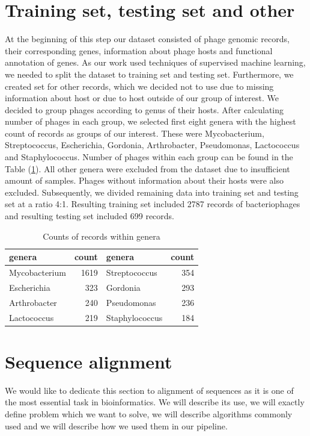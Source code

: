 \section{Training set, testing set and other}
At the beginning of this step our dataset consisted of phage genomic records, their corresponding genes, information about phage hosts and functional annotation of genes.
As our work used techniques of supervised machine learning, we needed to split the dataset to training set and testing set.
Furthermore, we created set for other records, which we decided not to use due to missing information about host or due to host outside of our group of interest.
We decided to group phages according to genus of their hosts.
After calculating number of phages in each group, we selected first eight genera with the highest count of records as groups of our interest.
These were Mycobacterium, Streptococcus, Escherichia, Gordonia, Arthrobacter, Pseudomonas, Lactococcus and Staphylococcus. 
Number of phages within each group can be found in the Table (\ref{tab:counts}).
All other genera were excluded from the dataset due to insufficient amount of samples.
Phages without information about their hosts were also excluded.
Subsequently, we divided remaining data into training set and testing set at a ratio 4:1.
Resulting training set included 2787 records of bacteriophages and resulting testing set included 699 records. 

\begin{table}
  \centering
    \begin{tabular}{ l  r  l  r }
      \hline
      genera & count & genera & count \\
      \hline
      Mycobacterium & 1619 & Streptococcus & 354 \\
      Escherichia & 323 & Gordonia & 293 \\
      Arthrobacter & 240 & Pseudomonas & 236 \\
      Lactococcus & 219 & Staphylococcus & 184 \\
      \hline
    \end{tabular}
    \caption{Counts of records within genera}
    \label{tab:counts}
\end{table}


\section{Sequence alignment}
We would like to dedicate this section to alignment of sequences as it is one of the most essential task in bioinformatics.
We will describe its use, we will exactly define problem which we want to solve, we will describe algorithms commonly used and we will describe how we used them in our pipeline. 

